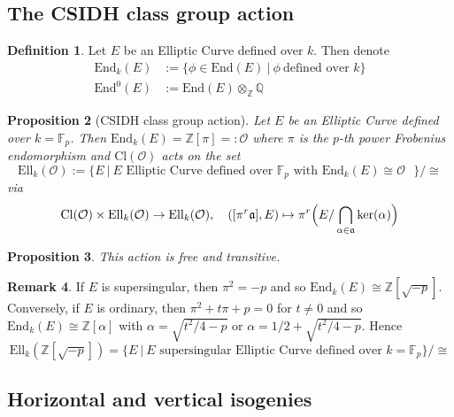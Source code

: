 \documentclass{scrartcl}
\newcommand{\Z}{\mathbb{Z}}
\newcommand{\F}{\mathbb{F}}
\newcommand{\End}{\mathrm{End}}
\newcommand{\Ell}{\mathrm{Ell}}
\newcommand{\Cl}{\mathrm{Cl}}
\newcommand{\Order}{\mathcal{O}}
\newtheorem{prop}{Proposition}[section]
\theoremstyle{definition}
\newtheorem{definition}[prop]{Definition}
\newtheorem{remark}[prop]{Remark}
\begin{document}
\subsection{The CSIDH class group action}

\begin{definition}
    Let $E$ be an Elliptic Curve defined over $k$.
    Then denote
    \begin{align*}
        \End_k(E) &:= \{ \phi \in \End(E) \ | \ \phi \ \text{defined over $k$} \} \\
        \End^0(E) &:= \End(E) \otimes_{\Z} {\mathbb{Q}}
    \end{align*}
\end{definition}
\begin{prop}[CSIDH class group action]
    Let $E$ be an Elliptic Curve defined over $k = \F_p$.
    Then $\End_k(E) = \Z[\pi] =: \Order$ where $\pi$ is the $p$-th power Frobenius endomorphism and $\Cl(\Order)$ acts on the set
    \begin{equation*}
        \Ell_k(\Order) := \{ E \ | \ \text{$E$ Elliptic Curve defined over $\F_p$ with $\End_k(E) \cong \Order$ }\} / \cong
    \end{equation*}
    via
    \begin{equation*}
        \Cl(\Order) \times \Ell_k(\Order) \to \Ell_k(\Order), \quad ([\pi^r\mathfrak{a}], E) \mapsto \pi^r\Bigl( E / \bigcap_{\alpha \in \mathfrak{a}} \ker(\alpha) \Bigr)
    \end{equation*}
\end{prop}
\begin{prop}
    This action is free and transitive.
\end{prop}
\begin{remark}
    If $E$ is supersingular, then $\pi^2 = -p$ and so $\End_k(E) \cong \Z[\sqrt{-p}]$.
    Conversely, if $E$ is ordinary, then $\pi^2 + t \pi + p = 0$ for $t \neq 0$ and so $\End_k(E) \cong \Z[\alpha]$ with $\alpha = \sqrt{t^2/4 - p}$ or $\alpha = 1/2 + \sqrt{t^2/4 - p}$.
    Hence
    \begin{equation*}
        \Ell_k(\Z[\sqrt{-p}]) = \{ E \ | \ \text{$E$ supersingular Elliptic Curve defined over $k = \F_p$} \} / \cong
    \end{equation*}
\end{remark}

\subsection{Horizontal and vertical isogenies}
\end{document}
